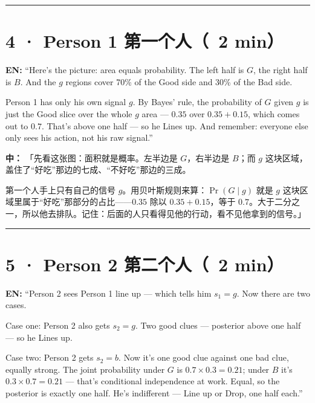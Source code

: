 \documentclass[11pt]{article}
\begin{document}
\vspace{0.35em}\noindent\rule{\textwidth}{0.3pt}\par

\section*{4 · Person 1 第一个人（~2 min）}

\textbf{EN:} “Here's the picture: area equals probability. The left half is \(G\), the right half is \(B\). And the \(g\) regions cover 70\% of the Good side and 30\% of the Bad side.\par

Person 1 has only his own signal \(g\). By Bayes' rule, the probability of \(G\) given \(g\) is just the Good slice over the whole \(g\) area — \(0.35\) over \(0.35+0.15\), which comes out to \(0.7\). That's above one half — so he Lines up. And remember: everyone else only sees his action, not his raw signal.”\par

\textbf{中：} 「先看这张图：面积就是概率。左半边是 \(G\)，右半边是 \(B\)；而 \(g\) 这块区域，盖住了“好吃”那边的七成、“不好吃”那边的三成。\par

第一个人手上只有自己的信号 \(g\)。用贝叶斯规则来算：\(\Pr(G\mid g)\) 就是 \(g\) 这块区域里属于“好吃”那部分的占比——\(0.35\) 除以 \(0.35+0.15\)，等于 \(0.7\)。大于二分之一，所以他去排队。记住：后面的人只看得见他的行动，看不见他拿到的信号。」\par

\vspace{0.35em}\noindent\rule{\textwidth}{0.3pt}\par

\section*{5 · Person 2 第二个人（~2 min）}

\textbf{EN:} “Person 2 sees Person 1 line up — which tells him \(s_1=g\). Now there are two cases.\par

Case one: Person 2 also gets \(s_2=g\). Two good clues — posterior above one half — so he Lines up.\par

Case two: Person 2 gets \(s_2=b\). Now it's one good clue against one bad clue, equally strong. The joint probability under \(G\) is \(0.7\times 0.3=0.21\); under \(B\) it's \(0.3\times 0.7=0.21\) — that's conditional independence at work. Equal, so the posterior is exactly one half. He's indifferent — Line up or Drop, one half each.”\par
\end{document}
